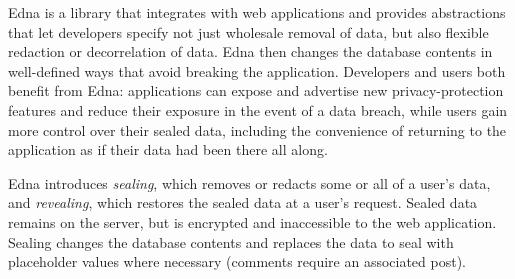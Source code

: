 \label{sec:intro:approach}
Edna is a library that integrates with web applications and
provides abstractions that let developers specify not just wholesale removal of
data, but also flexible redaction or decorrelation of data. Edna then changes
the database contents in well-defined ways that avoid breaking the application.
Developers and users both benefit from Edna: applications can expose and
advertise new privacy-protection features and reduce their exposure in the event
of a data breach, while users gain more control over their sealed data,
including the convenience of returning to the application as if their data had
been there all along.

Edna introduces \emph{sealing}, which removes or redacts some or all of a user's
data, and \emph{revealing}, which restores the sealed data at a user's request.
Sealed data remains on the server, but is encrypted and inaccessible to the web
application. Sealing changes the database contents and replaces the data to seal
with placeholder values where necessary (\eg comments require an associated
post). 

